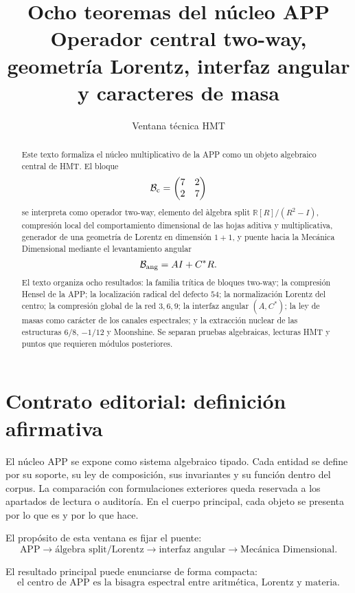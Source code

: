 \documentclass[11pt,a4paper]{article}
\title{\bfseries Ocho teoremas del n\'ucleo APP\\
\large Operador central two-way, geometr\'ia Lorentz, interfaz angular y caracteres de masa}
\author{Ventana t\'ecnica HMT}
\date{}
\newcommand{\Bc}{\mathcal B_{\rm c}}
\newcommand{\Bang}{\mathcal B_{\rm ang}}
\newcommand{\R}{\mathbb R}
\begin{document}
\maketitle

\begin{abstract}
Este texto formaliza el n\'ucleo multiplicativo de la APP como un objeto algebraico central de HMT. El bloque
\[
\Bc=\begin{pmatrix}7&2\\2&7\end{pmatrix}
\]
se interpreta como operador two-way, elemento del \`algebra split \(\R[R]/(R^2-I)\), compresi\'on local del comportamiento dimensional de las hojas aditiva y multiplicativa, generador de una geometr\'ia de Lorentz en dimensi\'on \(1+1\), y puente hacia la Mec\'anica Dimensional mediante el levantamiento angular
\[
\Bang=A I+C^\ast R.
\]
El texto organiza ocho resultados: la familia tr\'itica de bloques two-way; la compresi\'on Hensel de la APP; la localizaci\'on radical del defecto \(54\); la normalizaci\'on Lorentz del centro; la compresi\'on global de la red \(3,6,9\); la interfaz angular \((A,C^\ast)\); la ley de masas como car\'acter de los canales espectrales; y la extracci\'on nuclear de las estructuras \(6/8\), \(-1/12\) y Moonshine. Se separan pruebas algebraicas, lecturas HMT y puntos que requieren m\'odulos posteriores.
\end{abstract}

\tableofcontents
\newpage

\section{Contrato editorial: definici\'on afirmativa}

El n\'ucleo APP se expone como sistema algebraico tipado. Cada entidad se define por su soporte, su ley de composici\'on, sus invariantes y su funci\'on dentro del corpus. La comparaci\'on con formulaciones exteriores queda reservada a los apartados de lectura o auditor\'ia. En el cuerpo principal, cada objeto se presenta por lo que es y por lo que hace.

El prop\'osito de esta ventana es fijar el puente:
\[
\text{APP}\longrightarrow \text{\'algebra split/Lorentz}\longrightarrow \text{interfaz angular}\longrightarrow \text{Mec\'anica Dimensional}.
\]

El resultado principal puede enunciarse de forma compacta:
\[
\boxed{\text{el centro de APP es la bisagra espectral entre aritm\'etica, Lorentz y materia.}}
\]
\end{document}
